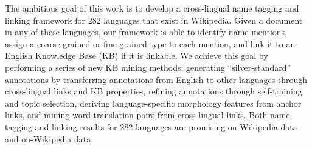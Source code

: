The ambitious goal of this work is to develop a cross-lingual name tagging and linking framework for 282 languages that exist in Wikipedia. Given a document in any of these languages, our framework is able to identify name mentions, assign a coarse-grained or fine-grained type to each mention, and link it to an English Knowledge Base (KB) if it is linkable. We achieve this goal by performing a series of new KB mining methods: generating ``silver-standard'' annotations by transferring annotations from English to other languages through cross-lingual links and KB properties, refining annotations through self-training and topic selection, deriving language-specific morphology features from anchor links, and mining word translation pairs from cross-lingual links. Both name tagging and linking results for 282 languages are promising on Wikipedia data and on-Wikipedia data.
